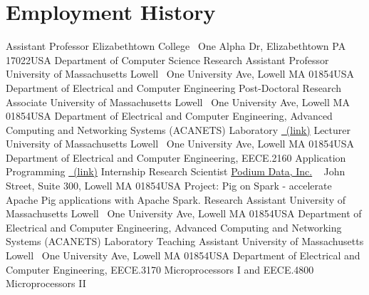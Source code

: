 \documentclass[11pt]{moderncv}
\begin{document}
\section{Employment History}
%
        {Assistant Professor}%
        {\small Elizabethtown College}%
        {\small ~\hfill\break One Alpha Dr, Elizabethtown PA 17022}{USA}%
        {Department of Computer Science}
%
%
        {Research Assistant Professor}%
        {\small University of Massachusetts Lowell}%
        {\small ~\hfill\break One University Ave, Lowell MA 01854}{USA}%
        {Department of Electrical and Computer Engineering}
%
%
        {Post-Doctoral Research Associate}%
        {\small University of Massachusetts Lowell}%
        {\small ~\hfill\break One University Ave, Lowell MA 01854}{USA}%
        {Department of Electrical and Computer Engineering, \newline
         Advanced Computing and Networking Systems (ACANETS) Laboratory \href{http://acanets.uml.edu/}{\color{color2}\homepagesymbol~(link)}
        }
%
%
        {Lecturer}%
        {\small University of Massachusetts Lowell}%
        {\small ~\hfill\break One University Ave, Lowell MA 01854}{USA}%
        {Department of Electrical and Computer Engineering, \newline
         EECE.2160 Application Programming \href{http://mjgeiger.github.io/eece2160/}{\color{color2}\homepagesymbol~(link)}
        }
%
%
        {Internship Research Scientist}%
        {\small \href{http://www.podiumdata.com/}{Podium Data, Inc.}}%
        {\small ~\hfill{} John Street, Suite 300, Lowell MA 01854}{USA}%
        {Project: Pig on Spark - accelerate Apache Pig applications with Apache Spark.
        }
%
        {Research Assistant}%
        {\small University of Massachusetts Lowell}%
        {\small ~\hfill\break One University Ave, Lowell MA 01854}{USA}%
        {Department of Electrical and Computer Engineering, \newline
         Advanced Computing and Networking Systems (ACANETS) Laboratory
        }
%
%
        {Teaching Assistant}%
        {\small University of Massachusetts Lowell}%
        {\small ~\hfill\break One University Ave, Lowell MA 01854}{USA}%
        {Department of Electrical and Computer Engineering, \newline
         EECE.3170 Microprocessors I and EECE.4800 Microprocessors II
        }
\end{document}
